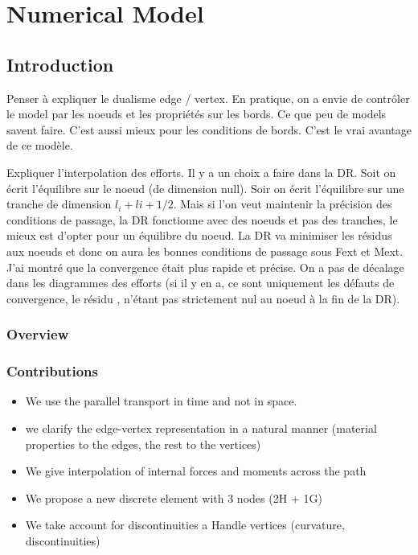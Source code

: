 
\chapter{Numerical Model} \label{chp:numerical_model}

\section{Introduction}

Penser à expliquer le dualisme edge / vertex. En pratique, on a envie de contrôler le model par les noeuds et les propriétés sur les bords. Ce que peu de models savent faire. C'est aussi mieux pour les conditions de bords. C'est le vrai avantage de ce modèle.

Expliquer l'interpolation des efforts. Il y a un choix a faire dans la DR. Soit on écrit l'équilibre sur le noeud (de dimension null). Soir on écrit l'équilibre sur une tranche de dimension $l_i+l{i+1}/2$. Mais si l'on veut maintenir la précision des conditions de passage, la DR fonctionne avec des noeuds et pas des tranches, le mieux est d'opter pour un équilibre du noeud. La DR va minimiser les résidus aux noeuds et donc on aura les bonnes conditions de passage sous Fext et Mext. J'ai montré que la convergence était plus rapide et précise. On a pas de décalage dans les diagrammes des efforts (si il y en a, ce sont uniquement les défauts de convergence, le résidu , n'étant pas strictement nul au noeud à la fin de la DR).

\subsection{Overview}

\subsection{Contributions}
\begin{itemize}
	\item We use the parallel transport in time and not in space.
	\item we clarify the edge-vertex representation in a natural manner (material properties to the edges, the rest to the vertices)
	\item We give interpolation of internal forces and moments across the path
	\item We propose a new discrete element with 3 nodes (2H + 1G)
	\item We take account for discontinuities a Handle vertices (curvature, discontinuities)
\end{itemize}

